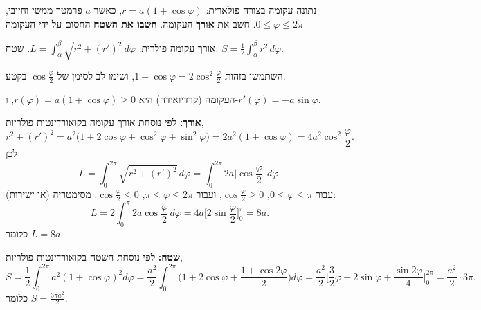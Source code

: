 
\begin{question}
נתונה עקומה בצורה פולארית: $r=a(1+\cos\varphi)$, כאשר $a$ פרמטר ממשי וחיובי, $0\le\varphi\le2\pi$.
חשב את \textbf{אורך} העקומה. \textbf{חשבו את השטח} החסום על ידי העקומה
\end{question}

\begin{hint}
אורך עקומה פולרית: $L=\int_\alpha^\beta\sqrt{r^2+(r')^2}\,d\varphi$. שטח: $S=\frac12\int_\alpha^\beta r^2\,d\varphi$.
\end{hint}

\begin{hint}
השתמשו בזהות $1+\cos\varphi=2\cos^2\frac{\varphi}{2}$, ושימו לב לסימן של $\cos\frac\varphi2$ בקטע.
\end{hint}

\begin{solution}
העקומה (קרדיואידה) היא $r(\varphi)=a(1+\cos\varphi)\ge0$, ו-$r'(\varphi)=-a\sin\varphi$.

\textbf{אורך:} לפי נוסחת אורך עקומה בקואורדינטות פולריות,
\[ r^2+(r')^2=a^2\big(1+2\cos\varphi+\cos^2\varphi+\sin^2\varphi\big)=2a^2(1+\cos\varphi)=4a^2\cos^2\frac{\varphi}{2}. \]
לכן
\[ L=\int_0^{2\pi}\sqrt{r^2+(r')^2}\,d\varphi=\int_0^{2\pi}2a\Big|\cos\frac{\varphi}{2}\Big|\,d\varphi . \]
עבור $0\le\varphi\le\pi$, $\cos\frac\varphi2\ge0$, ועבור $\pi\le\varphi\le2\pi$, $\cos\frac\varphi2\le0$. מסימטריה (או ישירות):
\[ L=2\int_0^{\pi}2a\cos\frac{\varphi}{2}\,d\varphi=4a\Big[2\sin\frac\varphi2\Big]_0^{\pi}=8a . \]
כלומר $\boxed{L=8a}$.

\textbf{שטח:} לפי נוסחת השטח בקואורדינטות פולריות,
\[ S=\frac12\int_0^{2\pi}a^2(1+\cos\varphi)^2d\varphi=\frac{a^2}{2}\int_0^{2\pi}\Big(1+2\cos\varphi+\frac{1+\cos2\varphi}{2}\Big)d\varphi
=\frac{a^2}{2}\Big[\frac32\varphi+2\sin\varphi+\frac{\sin2\varphi}{4}\Big]_0^{2\pi}=\frac{a^2}{2}\cdot3\pi . \]
כלומר $\boxed{S=\frac{3\pi a^2}{2}}$.
\end{solution}
